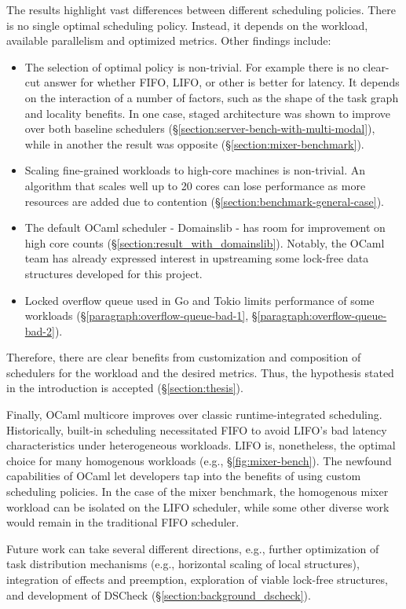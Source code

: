 \documentclass[12pt,a4paper,twoside]{report}
\begin{document}
The results highlight vast differences between different scheduling policies. There is no single optimal scheduling policy. Instead, it depends on the workload, available parallelism and optimized metrics. Other findings include: 
\begin{itemize}
    \item The selection of optimal policy is non-trivial. For example there is no clear-cut answer for whether FIFO, LIFO, or other is better for latency. It depends on the interaction of a number of factors, such as the shape of the task graph and locality benefits. In one case, staged architecture was shown to improve over both baseline schedulers (\S\ref{section:server-bench-with-multi-modal}), while in another the result was opposite (\S\ref{section:mixer-benchmark}).
    \item Scaling fine-grained workloads to high-core machines is non-trivial. An algorithm that scales well up to 20 cores can lose performance as more resources are added due to contention (\S\ref{section:benchmark-general-case}).
    \item The default OCaml scheduler - Domainslib \cite{ocamlmul59:online} - has room for improvement on high core counts (\S\ref{section:result_with_domainslib}). Notably, the OCaml team has already expressed interest in upstreaming some lock-free data structures developed for this project.
    \item Locked overflow queue used in Go and Tokio limits performance of some workloads (\S\ref{paragraph:overflow-queue-bad-1}, \S\ref{paragraph:overflow-queue-bad-2}).
\end{itemize}
Therefore, there are clear benefits from customization and composition of schedulers for the workload and the desired metrics. Thus, the hypothesis stated in the introduction is accepted (\S\ref{section:thesis}). 

Finally, OCaml multicore improves over classic runtime-integrated scheduling. Historically, built-in scheduling necessitated FIFO to avoid LIFO's bad latency characteristics under heterogeneous workloads. LIFO is, nonetheless, the optimal choice for many homogenous workloads (e.g., \S\ref{fig:mixer-bench}). The newfound capabilities of OCaml let developers tap into the benefits of using custom scheduling policies. In the case of the mixer benchmark, the homogenous mixer workload can be isolated on the LIFO scheduler, while some other diverse work would remain in the traditional FIFO scheduler.

Future work can take several different directions, e.g., further optimization of task distribution mechanisms (e.g., horizontal scaling of local structures), integration of effects and preemption, exploration of viable lock-free structures, and development of DSCheck (\S\ref{section:background_dscheck}). 
\end{document}

